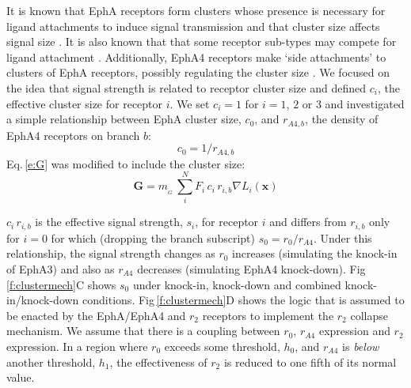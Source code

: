 \documentclass[11pt, a4paper]{article}
\begin{document}
It is known that EphA receptors form clusters whose presence is necessary for ligand attachments to induce signal transmission and that cluster size affects signal size \citep{nikolov_ephephrin_2013}. It is also known that that some receptor sub-types may compete for ligand attachment \citep{fiore_regulation_2019}.
Additionally, EphA4 receptors make `side attachments' to clusters of EphA receptors, possibly regulating the cluster size \citep{nikolov_ephephrin_2013}.
%
We focused on the idea that signal strength is related to receptor cluster size and defined $c_i$, the effective cluster size for receptor $i$.
We set $c_i=1$ for $i=1$, $2$ or $3$ and investigated a simple relationship between EphA cluster size, $c_0$, and $r_{\!\scriptscriptstyle A4,b}$, the density of EphA4 receptors on branch $b$:
\begin{equation}
    c_0 = 1/r_{\!\scriptscriptstyle A4,b}
\end{equation}
%
Eq.\,\ref{e:G} was modified to include the cluster size:
%
\begin{equation}\label{e:Gcs}
\mathbf{G} = m_{\!_G}\,\sum_i^N F_i\,c_i\,r_{i,b} \nabla L_i(\mathbf{x})
\end{equation}

$c_i\,r_{i,b}$ is the effective signal strength, $s_i$, for receptor $i$ and differs from $r_{i,b}$ only for $i=0$ for which (dropping the branch subscript) $s_0 = r_0/r_{\!\scriptscriptstyle A4}$.
Under this relationship, the signal strength changes as $r_0$ increases (simulating the knock-in of EphA3) and also as $r_{\!\scriptscriptstyle A4}$ decreases (simulating EphA4 knock-down).
Fig\,\ref{f:clustermech}C shows $s_0$ under knock-in, knock-down and combined knock-in/knock-down conditions.
Fig\,\ref{f:clustermech}D shows the logic that is assumed to be enacted by the EphA/EphA4 and $r_2$ receptors to implement the $r_2$ collapse mechanism. We assume that there is a coupling between $r_0$, $r_{A4}$ expression and $r_2$ expression. In a region where $r_0$ exceeds some threshold, $h_0$, and $r_{A4}$ is \emph{below} another threshold, $h_1$, the effectiveness of $r_2$ is reduced to one fifth of its normal value.
\end{document}
